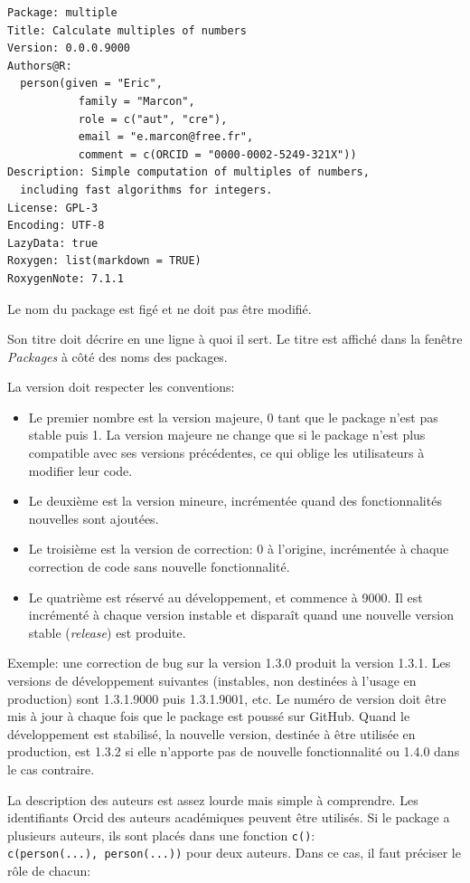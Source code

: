 \documentclass[
  12pt,
  french,
  a4paper,
  extrafontsizes,onecolumn,openright
  ]{memoir}
\providecommand{\tightlist}{%
  \setlength{\itemsep}{0pt}\setlength{\parskip}{0pt}}
\begin{document}
\begin{verbatim}
Package: multiple
Title: Calculate multiples of numbers
Version: 0.0.0.9000
Authors@R: 
  person(given = "Eric",
           family = "Marcon",
           role = c("aut", "cre"),
           email = "e.marcon@free.fr",
           comment = c(ORCID = "0000-0002-5249-321X"))
Description: Simple computation of multiples of numbers, 
  including fast algorithms for integers.
License: GPL-3
Encoding: UTF-8
LazyData: true
Roxygen: list(markdown = TRUE)
RoxygenNote: 7.1.1
\end{verbatim}

Le nom du package est figé et ne doit pas être modifié.

Son titre doit décrire en une ligne à quoi il sert.
Le titre est affiché dans la fenêtre \emph{Packages} à côté des noms des packages.

La version doit respecter les conventions:

\begin{itemize}
\tightlist
\item
  Le premier nombre est la version majeure, 0 tant que le package n'est pas stable puis 1.
  La version majeure ne change que si le package n'est plus compatible avec ses versions précédentes, ce qui oblige les utilisateurs à modifier leur code.
\item
  Le deuxième est la version mineure, incrémentée quand des fonctionnalités nouvelles sont ajoutées.
\item
  Le troisième est la version de correction: 0 à l'origine, incrémentée à chaque correction de code sans nouvelle fonctionnalité.
\item
  Le quatrième est réservé au développement, et commence à 9000.
  Il est incrémenté à chaque version instable et disparaît quand une nouvelle version stable (\emph{release}) est produite.
\end{itemize}

Exemple: une correction de bug sur la version 1.3.0 produit la version 1.3.1.
Les versions de développement suivantes (instables, non destinées à l'usage en production) sont 1.3.1.9000 puis 1.3.1.9001, etc.
Le numéro de version doit être mis à jour à chaque fois que le package est poussé sur GitHub.
Quand le développement est stabilisé, la nouvelle version, destinée à être utilisée en production, est 1.3.2 si elle n'apporte pas de nouvelle fonctionnalité ou 1.4.0 dans le cas contraire.

La description des auteurs est assez lourde mais simple à comprendre.
Les identifiants Orcid des auteurs académiques peuvent être utilisés.
Si le package a plusieurs auteurs, ils sont placés dans une fonction \texttt{c()}: \texttt{c(person(...),\ person(...))} pour deux auteurs.
Dans ce cas, il faut préciser le rôle de chacun:
\end{document}
